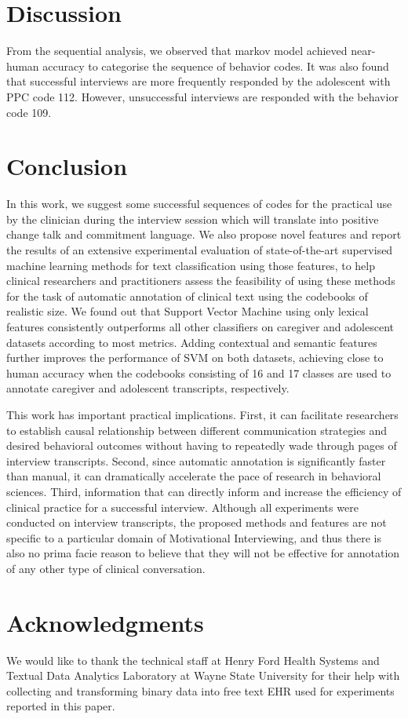 \documentclass{amia}
\begin{document}
\section*{Discussion}
From the sequential analysis, we observed that markov model achieved near-human accuracy to categorise the sequence of behavior codes. It was also found that successful interviews are more frequently responded by the adolescent with PPC code 112. However, unsuccessful interviews are responded with the behavior code 109.

\section*{Conclusion}
In this work, we suggest some successful sequences of codes for the practical use by the clinician during the interview session which will translate into positive change talk and commitment language. We also propose novel features and report the results of an extensive experimental evaluation of state-of-the-art supervised machine learning methods for text
classification using those features, to help clinical researchers and practitioners assess the feasibility of using these methods for the task of automatic annotation of clinical
text using the codebooks of realistic size. We found out that Support Vector Machine using only lexical features consistently outperforms all other classifiers on caregiver and
adolescent datasets according to most metrics. Adding contextual and semantic features further improves the performance of SVM on both datasets, achieving close to human accuracy
when the codebooks consisting of 16 and 17 classes are used to annotate caregiver and adolescent transcripts, respectively.

This work has important practical implications. First, it can facilitate researchers to establish causal relationship between different communication strategies and desired
behavioral outcomes without having to repeatedly wade through pages of interview transcripts. Second, since automatic annotation is significantly faster than manual, it can
dramatically accelerate the pace of research in behavioral sciences. Third, information that can directly inform and increase the efficiency of clinical practice for a successful interview. Although all experiments were conducted on interview transcripts, the proposed methods and features are not
specific to a particular domain of Motivational Interviewing, and thus there is also no prima facie reason to believe that they will not be effective for annotation of any other
type of clinical conversation.


\section*{Acknowledgments}
We would like to thank the technical staff at Henry Ford Health Systems and Textual Data Analytics Laboratory at Wayne State University for their help with collecting and transforming binary data into free text EHR used for experiments reported in this paper. 



\end{document}
